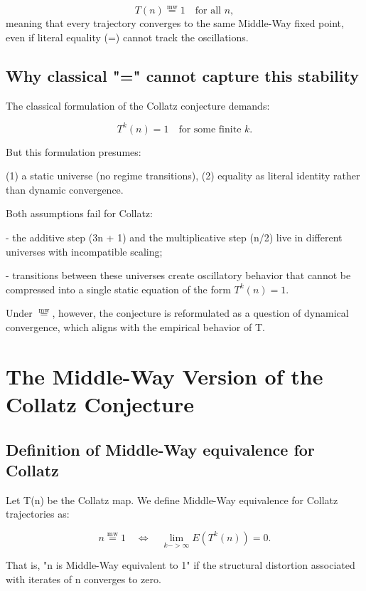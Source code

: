 \documentclass[11pt]{article}
\newcommand{\mweq}{\mathrel{\overset{\mathrm{mw}}{=}}}
\theoremstyle{definition}
\theoremstyle{remark}
\begin{document}
\[
  T(n) \mweq 1
  \quad \text{for all } n,
\]
meaning that every trajectory converges to the same Middle-Way fixed
point, even if literal equality (=) cannot track the oscillations.

\subsection{Why classical "=" cannot capture this stability}

The classical formulation of the Collatz conjecture demands:

\[
  T^k(n) = 1 \quad \text{for some finite } k.
\]

But this formulation presumes:

(1) a static universe (no regime transitions),  
(2) equality as literal identity rather than dynamic convergence.

Both assumptions fail for Collatz:

- the additive step (3n + 1) and the multiplicative step (n/2) live in
  different universes with incompatible scaling;

- transitions between these universes create oscillatory behavior that
  cannot be compressed into a single static equation of the form
  $T^k(n) = 1$.

Under $\mweq$, however, the conjecture is reformulated as a question of
dynamical convergence, which aligns with the empirical behavior of T.


\section{The Middle-Way Version of the Collatz Conjecture}

\subsection{Definition of Middle-Way equivalence for Collatz}

Let T(n) be the Collatz map.  
We define Middle-Way equivalence for Collatz trajectories as:

\[
  n \mweq 1
  \quad \Longleftrightarrow \quad
  \lim_{k->\infty} E(T^k(n)) = 0.
\]

That is, "n is Middle-Way equivalent to 1" if the structural distortion
associated with iterates of n converges to zero.
\end{document}
